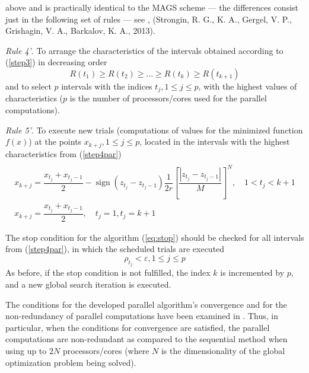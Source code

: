 \documentclass{gOMS2e}
\theoremstyle{plain}%
\theoremstyle{definition}
\DeclareMathOperator{\sign}{sign}
\theoremstyle{remark}
\begin{document}
above and is practically identical to the MAGS scheme --- the differences consist just in the
following set of rules --- see \cite{strSergGO}, (Strongin, R. G., K. A., Gergel, V. P., Grishagin, V. A., Barkalov, K. A.,  2013).
\par
\textit{Rule 4'}. To arrange the characteristics of the intervals obtained according to (\ref{step3}) in decreasing order
\begin{equation}
\label{step4par}
R(t_1)\geqslant R(t_2)\geqslant \dots \geqslant R(t_{k})\geqslant R(t_{k+1})
\end{equation}
and to select \(p\) intervals with the indices \(t_j,1\leqslant j\leqslant p\), with
the highest values of characteristics (\(p\) is the number of processors/cores used for the parallel computations).
\par
\textit{Rule 5'}. To execute new trials (computations of values for the minimized
function \(f(x)\)) at the points \(x_{k+j},1\leqslant j\leqslant p\), located in the
intervals with the highest characteristics from (\ref{step4par})
\begin{equation}
\label{step5par}
\begin{array}{cr}\\
x_{k+j}=\dfrac{x_{t_j}+x_{t_j-1}}{2}-\sign(z_{t_j}-z_{t_j-1})\dfrac{1}{2r}\left[\dfrac{|z_{t_j}-z_{t_j-1}|}{M}\right]^N,\quad 1<t_j<k+1 \\
x_{k+j}=\dfrac{x_{t_j}+x_{t_j-1}}{2},\quad t_j=1,t_j=k+1
\end{array}
\end{equation}
\par
The stop condition for the algorithm (\ref{eq:stop}) should be checked for all
intervals from (\ref{step4par}), in which the scheduled trials are executed
\begin{equation}
  \label{eq:stop}
\rho_{t_j}<\varepsilon,1\leqslant j\leqslant p
\end{equation}
As before, if the stop condition is not fulfilled, the index \(k\) is
incremented by \(p\), and a new global search iteration is executed.
\par
The conditions for the developed parallel algorithm’s convergence and for the
non-redundancy of parallel computations have been examined in \cite{strSergGO}.
Thus, in particular, when the conditions for convergence are satisfied, the parallel
computations are non-redundant as compared to the sequential method when using up to
\(2N\) processors/cores (where \(N\) is the dimensionality of the global optimization problem being solved).
\end{document}
